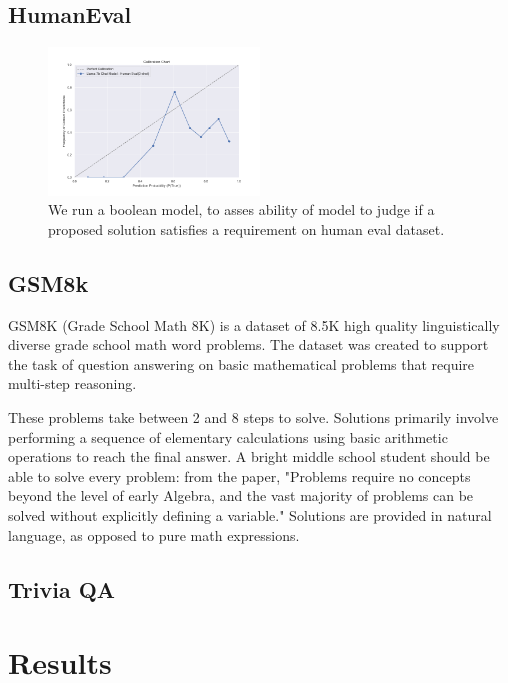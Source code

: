 \documentclass[11pt]{article}
\begin{document}
\subsection{HumanEval}

\begin{figure}
  \includegraphics[width=0.5\textwidth]{figures/0-shot-7b-human-eval.png}
  \caption{We run a boolean model, to asses ability of model to judge if a proposed solution satisfies a requirement on human eval dataset.}
  \label{fig:human-eval-results}
\end{figure}

\subsection{GSM8k}

GSM8K (Grade School Math 8K) is a dataset of 8.5K high quality linguistically diverse grade school math word problems. The dataset was created to support the task of question answering on basic mathematical problems that require multi-step reasoning.

These problems take between 2 and 8 steps to solve. Solutions primarily involve performing a sequence of elementary calculations using basic arithmetic operations  to reach the final answer. A bright middle school student should be able to solve every problem: from the paper, "Problems require no concepts beyond the level of early Algebra, and the vast majority of problems can be solved without explicitly defining a variable." Solutions are provided in natural language, as opposed to pure math expressions. 

\subsection{Trivia QA}


\section{Results}
\end{document}
